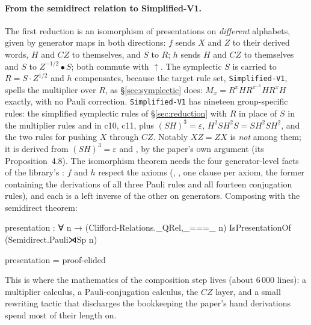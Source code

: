 \paragraph{From the semidirect relation to Simplified-V1.}  The first
reduction is an isomorphism of presentations on \emph{different}
alphabets, given by generator maps in both directions: $f$ sends $X$
and $Z$ to their derived words, $H$ and $CZ$ to themselves, and $S$ to
$R$; $h$ sends $H$ and $CZ$ to themselves and $S$ to $Z^{-1/2} \bullet
S$; both commute with $\uparrow$.  The symplectic $S$ is carried to
$R = S \cdot Z^{1/2}$ and $h$ compensates, because the target rule set,
\texttt{Simplified-V1}, spells the multiplier over $R$, as
\S\ref{sec:symplectic} does: $M_x = R^{x}HR^{x^{-1}}HR^{x}H$ exactly, with no Pauli
correction.  \texttt{Simplified-V1} has nineteen group-specific rules:
the simplified symplectic rules of \S\ref{sec:reduction} with $R$ in
place of $S$ in the multiplier rules and in c10, c11, plus
$(SH)^3 = \varepsilon$, $H^2SH^2S = SH^2SH^2$, and the two rules for
pushing $X$ through $CZ$.  Notably $XZ = ZX$ is \emph{not} among them;
it is derived from $(SH)^3 = \varepsilon$ and , by the
paper's own argument (its Proposition~4.8).  The isomorphism theorem
needs the four generator-level facts of the library's
: $f$ and $h$ respect the axioms
(, , one clause per axiom, the
former containing the derivations of all three Pauli rules and all
fourteen conjugation rules), and each is a left inverse of the other on
generators.  Composing with the semidirect theorem:

\begin{code}
presentation : ∀ {n} →
  (Clifford-Relations._QRel,_===_ n) IsPresentationOf (Semidirect.Pauli⋊Sp n)
\end{code}
\begin{code}[hide]
presentation = proof-elided
\end{code}

This is where the mathematics of the composition step lives (about
6\,000 lines): a multiplier calculus, a Pauli-conjugation calculus, the
$CZ$ layer, and a small rewriting tactic that discharges the
bookkeeping the paper's hand derivations spend most of their length
on.

